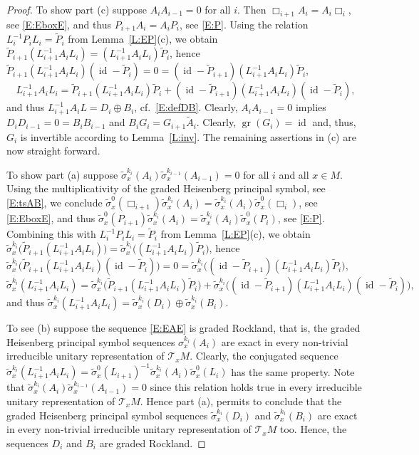 \documentclass[reqno,12pt]{amsart}
\DeclareMathOperator{\gr}{gr}
\DeclareMathOperator{\id}{id}
\theoremstyle{plain}
\theoremstyle{definition}
\begin{document}
\begin{proof}
To show part (c) suppose $A_iA_{i-1}=0$ for all $i$.
Then $\Box_{i+1}A_i=A_i\Box_i$, see \eqref{E:EboxE}, and thus $P_{i+1}A_i=A_iP_i$, see \eqref{E:P}.
Using the relation $L_i^{-1}P_iL_i=\tilde P_i$ from Lemma~\ref{L:EP}(c), we obtain $\tilde P_{i+1}(L_{i+1}^{-1}A_iL_i)=(L_{i+1}^{-1}A_iL_i)\tilde P_i$, hence $\tilde P_{i+1}(L_{i+1}^{-1}A_iL_i)(\id-\tilde P_i)=0=(\id-\tilde P_{i+1})(L_{i+1}^{-1}A_iL_i)\tilde P_i$,
$$
L^{-1}_{i+1}A_iL_i=\tilde P_{i+1}(L^{-1}_{i+1}A_iL_i)\tilde P_i
+(\id-\tilde P_{i+1})(L^{-1}_{i+1}A_iL_i)(\id-\tilde P_i),
$$ 
and thus $L^{-1}_{i+1}A_iL=D_i\oplus B_i$, cf.\ \eqref{E:defDB}.
Clearly, $A_iA_{i-1}=0$ implies $D_iD_{i-1}=0=B_iB_{i-1}$ and $B_iG_i=G_{i+1}\tilde A_i$.
Clearly, $\gr(G_i)=\id$ and, thus, $G_i$ is invertible according to Lemma~\ref{L:inv}.
The remaining assertions in (c) are now straight forward.


To show part (a) suppose $\tilde\sigma^{k_i}_x(A_i)\tilde\sigma^{k_{i-1}}_x(A_{i-1})=0$ for all $i$ and all $x\in M$.
Using the multiplicativity of the graded Heisenberg principal symbol, see \eqref{E:tsAB}, we conclude $\tilde\sigma^0_x(\Box_{i+1})\tilde\sigma^{k_i}_x(A_i)=\tilde\sigma_x^{k_i}(A_i)\tilde\sigma^0_x(\Box_i)$, see \eqref{E:EboxE}, and thus $\tilde\sigma^0_x(P_{i+1})\tilde\sigma^{k_i}_x(A_i)=\tilde\sigma^{k_i}_x(A_i)\tilde\sigma^0_x(P_i)$, see \eqref{E:P}.
Combining this with $L_i^{-1}P_iL_i=\tilde P_i$ from Lemma~\ref{L:EP}(c), we obtain $\tilde\sigma_x^{k_i}\bigl(\tilde P_{i+1}(L_{i+1}^{-1}A_iL_i)\bigr)=\tilde\sigma^{k_i}_x\bigl((L_{i+1}^{-1}A_iL_i)\tilde P_i\bigr)$, hence 
$\tilde\sigma^{k_i}_x\bigl(\tilde P_{i+1}(L_{i+1}^{-1}A_iL_i)(\id-\tilde P_i)\bigr)=0=\tilde\sigma^{k_i}_x\bigl((\id-\tilde P_{i+1})(L_{i+1}^{-1}A_iL_i)\tilde P_i\bigr)$,
$$
\tilde\sigma^{k_i}_x(L^{-1}_{i+1}A_iL_i)
=\tilde\sigma^{k_i}_x\bigl(\tilde P_{i+1}(L^{-1}_{i+1}A_iL_i)\tilde P_i\bigr)
+\tilde\sigma^{k_i}_x\bigl((\id-\tilde P_{i+1})(L^{-1}_{i+1}A_iL_i)(\id-\tilde P_i)\bigr),
$$ 
and thus $\tilde\sigma^{k_i}_x(L^{-1}_{i+1}A_iL_i)=\tilde\sigma^{k_i}_x(D_i)\oplus\tilde\sigma^{k_i}_x(B_i)$.


To see (b) suppose the sequence \eqref{E:EAE} is graded Rockland, that is, the graded Heisenberg principal symbol sequences $\sigma^{k_i}_x(A_i)$ are exact in every non-trivial irreducible unitary representation of $\mathcal T_xM$.
Clearly, the conjugated sequence $\tilde\sigma^{k_i}_x(L_{i+1}^{-1}A_iL_i)=\tilde\sigma^0_x(L_{i+1})^{-1}\tilde\sigma^{k_i}_x(A_i)\tilde\sigma^0_x(L_i)$ has the same property.
Note that $\tilde\sigma^{k_i}_x(A_i)\tilde\sigma^{k_{i-1}}_x(A_{i-1})=0$ since this relation holds true in every irreducible unitary representation of $\mathcal T_xM$.
Hence part (a), permits to conclude that the graded Heisenberg principal symbol sequences $\tilde\sigma^{k_i}_x(D_i)$ and $\tilde\sigma^{k_i}_x(B_i)$ are  exact in every non-trivial irreducible unitary representation of $\mathcal T_xM$ too.
Hence, the sequences $D_i$ and $B_i$ are graded Rockland.
\end{proof}
\end{document}
